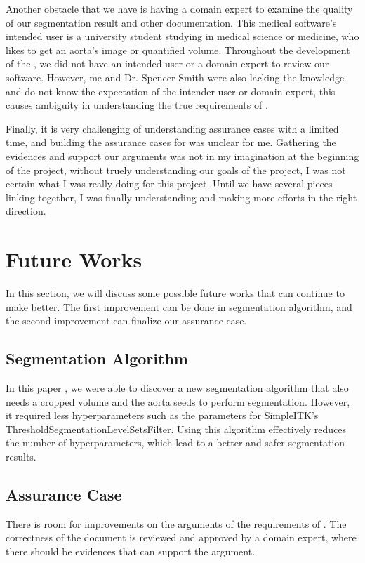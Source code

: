 Another obstacle that we have is having a domain expert to examine the quality of our segmentation result and other documentation. This medical software's intended user is a university student studying in medical science or medicine, who likes to get an aorta's image or quantified volume. Throughout the development of the \progname{}, we did not have an intended user or a domain expert to review our software. However, me and Dr. Spencer Smith were also lacking the knowledge and do not know the expectation of the intender user or domain expert, this causes ambiguity in understanding the true requirements of \progname{}.

Finally, it is very challenging of understanding assurance cases with a limited time, and building the assurance cases for \progname{} was unclear for me. Gathering the evidences and support our arguments was not in my imagination at the beginning of the project, without truely understanding our goals of the project, I was not certain what I was really doing for this project. Until we have several pieces linking together, I was finally understanding and making more efforts in the right direction. 

\section{Future Works}\label{fw}

In this section, we will discuss some possible future works that can continue to make \progname{} better. The first improvement can be done in segmentation algorithm, and the second improvement can finalize our assurance case.

\subsection{Segmentation Algorithm}

In this paper \cite{6346433}, we were able to discover a new segmentation algorithm that also needs a cropped volume and the aorta seeds to perform segmentation. However, it required less hyperparameters such as the parameters for SimpleITK's ThresholdSegmentationLevelSetsFilter. Using this algorithm effectively reduces the number of hyperparameters, which lead to a better and safer segmentation results.

\subsection{Assurance Case}

There is room for improvements on the arguments of the requirements of \progname{}. The correctness of the document is reviewed and approved by a domain expert, where there should be evidences that can support the argument.